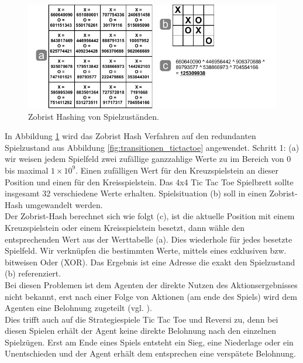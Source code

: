 \begin{figure}[!htbp]
  \centering
  \includegraphics[scale = 1.3]{inhalt/abbildungen/zobrist_hash_tictactoe.pdf}
  \caption{Zobrist Hashing von Spielzuständen.}
  \label{fig:zobrist_hash_tictactoe}
\end{figure} 


In Abbildung \ref{fig:zobrist_hash_tictactoe} wird das Zobrist Hash Verfahren auf den redundanten Spielzustand aus Abbildung \ref{fig:transitionen_tictactoe} angewendet. Schritt 1: (a) wir weisen jedem Spielfeld zwei zufällige ganzzahlige Werte zu im Bereich von 0 bis maximal $1 \times 10^{9}$. Einen zufälligen Wert für den Kreuzspielstein an dieser Position und einen für den Kreisspielstein. Das 4x4 Tic Tac Toe Spielbrett sollte insgesamt 32 verschiedene Werte erhalten. Spielsituation (b) soll in einen Zobrist-Hash umgewandelt werden. \\

Der Zobrist-Hash berechnet sich wie folgt (c), ist die aktuelle Position mit einem Kreuzspielstein oder einem Kreisspielstein besetzt, dann wähle den entsprechenden Wert aus der Werttabelle (a). Dies wiederhole für jedes besetzte Spielfeld. Wir verknüpfen die bestimmten Werte, mittels eines exklusiven bzw. bitweisen Oder (XOR). Das Ergebnis ist eine Adresse die exakt den Spielzustand (b) referenziert. \\


















Bei diesen Problemen ist dem Agenten der direkte Nutzen des Aktionsergebnisses nicht bekannt, erst nach einer Folge von Aktionen (am ende des Spiels) wird dem Agenten eine Belohnung zugeteilt (vgl. \cite[397]{Alpaydin}). \\

Dies trifft auch auf die Strategiespiele Tic Tac Toe und Reversi zu, denn bei diesen Spielen erhält der Agent keine direkte Belohnung nach den einzelnen Spielzügen. Erst am Ende eines Spiels entsteht ein Sieg, eine Niederlage oder ein Unentschieden und der Agent erhält dem entsprechen eine verspätete Belohnung. \\  